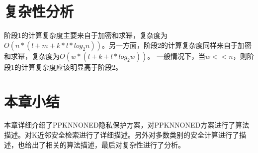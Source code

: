 \section{复杂性分析}
阶段1的计算复杂度主要来自于加密和求幂，复杂度为$O(n*(l+m+k*l*log_2n))$。另一方面，阶段2的计算复杂度同样来自于加密和求幂，复杂度为$O(w*(l+k+l*log_2w))$。 一般情况下，当$w << n$，则阶段1的计算复杂度应该明显高于阶段2。
\section{本章小结}
本章详细介绍了PPKNNONED隐私保护方案，对PPKNNONED方案进行了算法描述。对K近邻安全检索进行了详细描述。另外对多数类别的安全计算进行了描述，也给出了相关的算法描述，最后对复杂性进行了分析。
